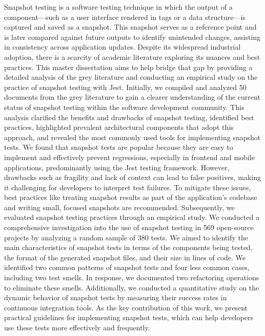 Snapshot testing is a software testing technique in which the output of a component—such as a user interface rendered in tags or a data structure—is captured and saved as a snapshot. This snapshot serves as a reference point and is later compared against future outputs to identify unintended changes, assisting in consistency across application updates. Despite its widespread industrial adoption, there is a scarcity of academic literature exploring its nuances and best practices. This master dissertation aims to help bridge that gap by providing a detailed analysis of the grey literature and conducting an empirical study on the practice of snapshot testing with Jest. Initially, we compiled and analyzed 50 documents from the grey literature to gain a clearer understanding of the current status of snapshot testing within the software development community. This analysis clarified the benefits and drawbacks of snapshot testing, identified best practices, highlighted prevalent architectural components that adopt this approach, and revealed the most commonly used tools for implementing snapshot tests. We found that snapshot tests are popular because they are easy to implement and effectively prevent regressions, especially in frontend and mobile applications, predominantly using the Jest testing framework. However, drawbacks such as fragility and lack of context can lead to false positives, making it challenging for developers to interpret test failures. To mitigate these issues, best practices like treating snapshot results as part of the application's codebase and writing small, focused snapshots are recommended. Subsequently, we evaluated snapshot testing practices through an empirical study. We conducted a comprehensive investigation into the use of snapshot testing in 569 open-source projects by analyzing a random sample of 380 tests. We aimed to identify the main characteristics of snapshot tests in terms of the components being tested, the format of the generated snapshot files, and their size in lines of code. We identified two common patterns of snapshot tests and four less common cases, including two test smells. In response, we documented two refactoring operations to eliminate these smells. Additionally, we conducted a quantitative study on the dynamic behavior of snapshot tests by measuring their success rates in continuous integration tools. As the key contribution of this work, we present practical guidelines for implementing snapshot tests, which can help developers use these tests more effectively and frequently.
